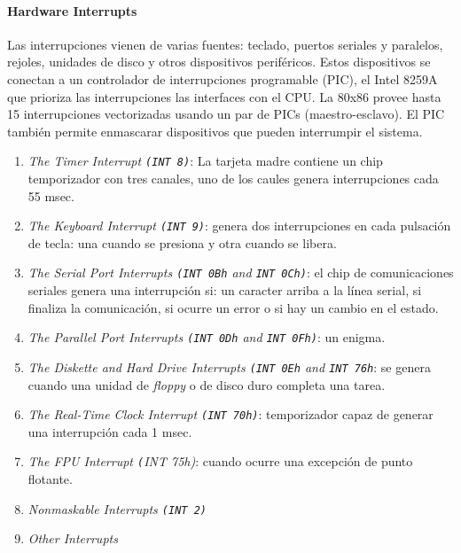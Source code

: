 \paragraph{\textnormal{\textbf{Hardware Interrupts}}}
Las interrupciones vienen de varias fuentes: teclado, puertos seriales y paralelos, rejoles, unidades de disco y otros dispositivos periféricos. Estos dispositivos se conectan a un controlador de interrupciones programable (PIC), el Intel 8259A  que prioriza las interrupciones las interfaces con el CPU. La 80x86 provee hasta 15 interrupciones vectorizadas usando un par de PICs (maestro-esclavo). El PIC también permite enmascarar dispositivos que pueden interrumpir el sistema. 


\begin{enumerate}
    \item \textit{The Timer Interrupt \texttt{(INT 8)}}: La tarjeta madre contiene un chip temporizador con tres canales, uno de los caules genera interrupciones cada 55 msec.
    \item \textit{The Keyboard Interrupt \texttt{(INT 9)}}: genera dos interrupciones en cada pulsación de tecla: una cuando se presiona y otra cuando se libera.
    \item \textit{The Serial Port Interrupts \texttt{(INT 0Bh} and \texttt{INT 0Ch)}}: el chip de comunicaciones seriales genera una interrupción si: un caracter arriba a la línea serial, si finaliza la comunicación, si ocurre un error o si hay un cambio en el estado.
    \item \textit{The Parallel Port Interrupts \texttt{(INT 0Dh} and \texttt{INT 0Fh)}}: un enigma.
    \item \textit{The Diskette and Hard Drive Interrupts \texttt{(INT 0Eh} and \texttt{INT 76h}}: se genera cuando una unidad de \textit{floppy} o de disco duro completa una tarea.
    \item \textit{The Real-Time Clock Interrupt \texttt{(INT 70h)}}: temporizador capaz de generar una interrupción cada 1 msec.
    \item \textit{The FPU Interrupt \texttt(INT 75h)}: cuando ocurre una excepción de punto flotante.
    \item \textit{Nonmaskable Interrupts \texttt{(INT 2)}}
    \item \textit{Other Interrupts}
\end{enumerate}


